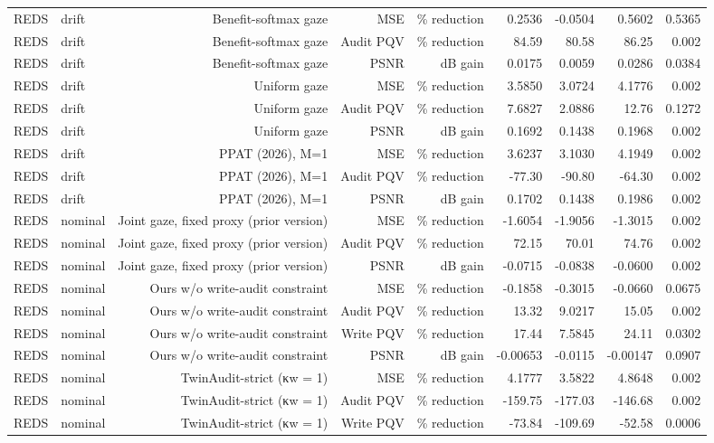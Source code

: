 \begin{table}[t]
\begin{tabular}{llrrrrrrr}
REDS & drift & Benefit-softmax gaze & MSE & \% reduction & 0.2536 & -0.0504 & 0.5602 & 0.5365 \\
REDS & drift & Benefit-softmax gaze & Audit PQV & \% reduction & 84.59 & 80.58 & 86.25 & 0.002 \\
REDS & drift & Benefit-softmax gaze & PSNR & dB gain & 0.0175 & 0.0059 & 0.0286 & 0.0384 \\
REDS & drift & Uniform gaze & MSE & \% reduction & 3.5850 & 3.0724 & 4.1776 & 0.002 \\
REDS & drift & Uniform gaze & Audit PQV & \% reduction & 7.6827 & 2.0886 & 12.76 & 0.1272 \\
REDS & drift & Uniform gaze & PSNR & dB gain & 0.1692 & 0.1438 & 0.1968 & 0.002 \\
REDS & drift & PPAT (2026), M=1 & MSE & \% reduction & 3.6237 & 3.1030 & 4.1949 & 0.002 \\
REDS & drift & PPAT (2026), M=1 & Audit PQV & \% reduction & -77.30 & -90.80 & -64.30 & 0.002 \\
REDS & drift & PPAT (2026), M=1 & PSNR & dB gain & 0.1702 & 0.1438 & 0.1986 & 0.002 \\
REDS & nominal & Joint gaze, fixed proxy (prior version) & MSE & \% reduction & -1.6054 & -1.9056 & -1.3015 & 0.002 \\
REDS & nominal & Joint gaze, fixed proxy (prior version) & Audit PQV & \% reduction & 72.15 & 70.01 & 74.76 & 0.002 \\
REDS & nominal & Joint gaze, fixed proxy (prior version) & PSNR & dB gain & -0.0715 & -0.0838 & -0.0600 & 0.002 \\
REDS & nominal & Ours w/o write-audit constraint & MSE & \% reduction & -0.1858 & -0.3015 & -0.0660 & 0.0675 \\
REDS & nominal & Ours w/o write-audit constraint & Audit PQV & \% reduction & 13.32 & 9.0217 & 15.05 & 0.002 \\
REDS & nominal & Ours w/o write-audit constraint & Write PQV & \% reduction & 17.44 & 7.5845 & 24.11 & 0.0302 \\
REDS & nominal & Ours w/o write-audit constraint & PSNR & dB gain & -0.00653 & -0.0115 & -0.00147 & 0.0907 \\
REDS & nominal & TwinAudit-strict (κw = 1) & MSE & \% reduction & 4.1777 & 3.5822 & 4.8648 & 0.002 \\
REDS & nominal & TwinAudit-strict (κw = 1) & Audit PQV & \% reduction & -159.75 & -177.03 & -146.68 & 0.002 \\
REDS & nominal & TwinAudit-strict (κw = 1) & Write PQV & \% reduction & -73.84 & -109.69 & -52.58 & 0.0006 \\

\end{tabular}
\end{table}
